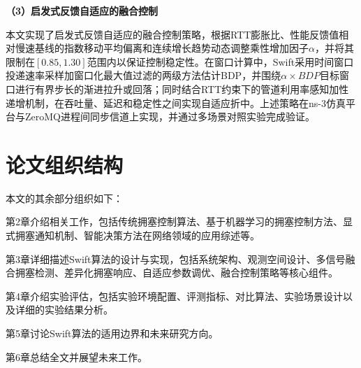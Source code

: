 \textbf{（3）启发式反馈自适应的融合控制}

本文实现了启发式反馈自适应的融合控制策略，根据RTT膨胀比、性能反馈值相对慢速基线的指数移动平均偏离和连续增长趋势动态调整乘性增加因子$\alpha$，并将其限制在$[0.85, 1.30]$范围内以保证控制稳定性。在窗口计算中，Swift采用时间窗口投递速率采样加窗口化最大值过滤的两级方法估计BDP，并围绕$\alpha \times BDP$目标窗口进行有界步长的渐进拉升或回落；同时结合RTT约束下的管道利用率感知加性递增机制，在吞吐量、延迟和稳定性之间实现自适应折中。上述策略在ns-3仿真平台与ZeroMQ进程间同步信道上实现，并通过多场景对照实验完成验证。

\section{论文组织结构}

本文的其余部分组织如下：

第2章介绍相关工作，包括传统拥塞控制算法、基于机器学习的拥塞控制方法、显式拥塞通知机制、智能决策方法在网络领域的应用综述等。

第3章详细描述Swift算法的设计与实现，包括系统架构、观测空间设计、多信号融合拥塞检测、差异化拥塞响应、自适应参数调优、融合控制策略等核心组件。

第4章介绍实验评估，包括实验环境配置、评测指标、对比算法、实验场景设计以及详细的实验结果分析。

第5章讨论Swift算法的适用边界和未来研究方向。

第6章总结全文并展望未来工作。

